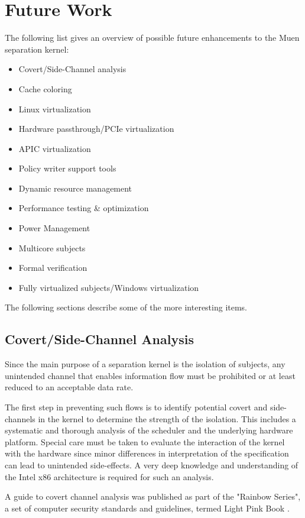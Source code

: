 \section{Future Work}
The following list gives an overview of possible future enhancements to the
Muen separation kernel:

\begin{itemize}
	\item Covert/Side-Channel analysis
	\item Cache coloring
	\item Linux virtualization
	\item Hardware passthrough/PCIe virtualization
	\item APIC virtualization
	\item Policy writer support tools
	\item Dynamic resource management
	\item Performance testing \& optimization
	\item Power Management
	\item Multicore subjects
	\item Formal verification
	\item Fully virtualized subjects/Windows virtualization
\end{itemize}

The following sections describe some of the more interesting items.

\subsection{Covert/Side-Channel Analysis}
Since the main purpose of a separation kernel is the isolation of subjects, any
unintended channel that enables information flow must be prohibited or at least
reduced to an acceptable data rate.

The first step in preventing such flows is to identify potential covert and
side-channels in the kernel to determine the strength of the isolation. This
includes a systematic and thorough analysis of the scheduler and the underlying
hardware platform. Special care must be taken to evaluate the interaction of the
kernel with the hardware since minor differences in interpretation of the
specification can lead to unintended side-effects. A very deep knowledge and
understanding of the Intel x86 architecture is required for such an analysis.

A guide to covert channel analysis was published as part of the "Rainbow
Series", a set of computer security standards and guidelines, termed Light Pink
Book \cite{LightPinkBook}.

